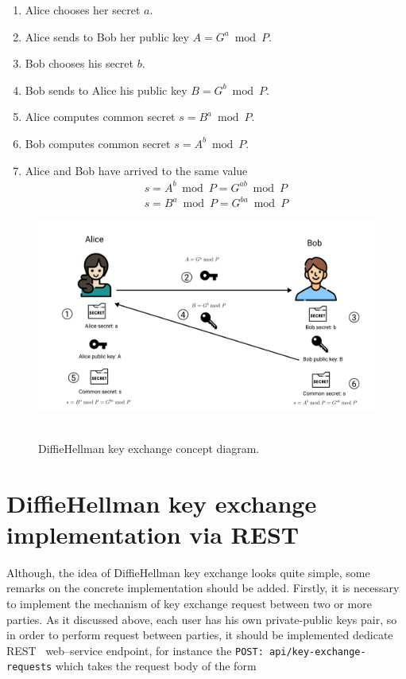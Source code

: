 \documentclass[12pt,letterpaper,oneside,reqno]{amsart}
\numberwithin{equation}{section}
\begin{document}
    \begin{enumerate}
        \item Alice chooses her secret $a$.
        \item Alice sends to Bob her public key $A = G^a \bmod P$.
        \item Bob chooses his secret $b$.
        \item Bob sends to Alice his public key $B = G^b \bmod P$.
        \item Alice computes common secret $s = B^a \bmod P$.
        \item Bob computes common secret $s = A^b \bmod P$.
        \item Alice and Bob have arrived to the same value
        \begin{eqnarray}
            s = A^b \bmod P = G^{ab} \bmod P \\
            s = B^a \bmod P = G^{ba} \bmod P
        \end{eqnarray}
    \end{enumerate}

    \begin{figure}[H]
        \centering
        \includegraphics[width=1\textwidth]{Pictures/DH_Key_Exchange}
        ~\caption{Diffie\textendash Hellman key exchange concept diagram.}\label{fig:figure}
    \end{figure}


    \section{Diffie\textendash Hellman key exchange implementation via REST}
    \label{sec:diffie–-hellman-key-exchange-implementation-via-rest}
    Although, the idea of Diffie\textendash Hellman key exchange looks quite simple,
    some remarks on the concrete implementation should be added.
    Firstly, it is necessary to implement the mechanism of key exchange request between two or more parties.
    As it discussed above, each user has his own private-public keys pair, so in order to perform request between parties,
    it should be implemented dedicate REST~\cite{ong2015materials} web--service endpoint,
    for instance the \texttt{POST: api/key-exchange-requests} which takes the request body of the form
\end{document}
